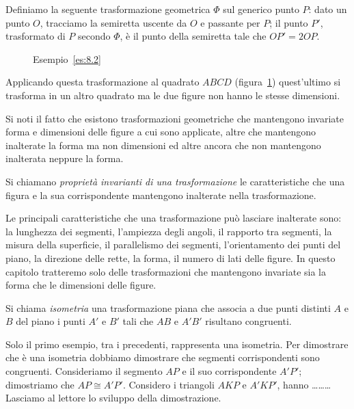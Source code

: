 \begin{esempio}\label{es:8.2}
Definiamo la seguente trasformazione geometrica $\Phi$ sul generico 
punto $P$: dato un punto $O$, tracciamo la semiretta uscente da $O$ e 
passante per $P$; il punto $P'$, trasformato di $P$ secondo $\Phi$, è 
il punto della semiretta tale che $OP'=2OP$.\vspace{7pt}


\begin{inaccessibleblock}
 \begin{figure}[!htb]
    \centering
  \caption{Esempio~\ref{es:8.2}}\label{fig:es8.2}
\end{figure}
\end{inaccessibleblock}

Applicando questa trasformazione al quadrato $ABCD$ 
(figura~\ref{fig:es8.2}) quest'ultimo si trasforma in un altro 
quadrato ma le due figure non hanno le stesse dimensioni.
\end{esempio}

Si noti il fatto che esistono trasformazioni geometriche che 
mantengono invariate forma e dimensioni delle figure a cui sono 
applicate, altre che mantengono inalterate la forma ma non dimensioni 
ed altre ancora che non mantengono inalterata neppure la forma.

\begin{definizione}
Si chiamano \emph{proprietà invarianti di una trasformazione} le 
caratteristiche che una figura e la sua corrispondente mantengono 
inalterate nella trasformazione.
\end{definizione}

Le principali caratteristiche che una trasformazione può lasciare 
inalterate sono: la lunghezza dei segmenti, l'ampiezza degli angoli, 
il rapporto tra segmenti, la misura della superficie, il parallelismo 
dei segmenti, l'orientamento dei punti del piano, la direzione delle 
rette, la forma, il numero di lati delle figure.
In questo capitolo tratteremo solo delle trasformazioni che 
mantengono invariate sia la forma che le dimensioni delle figure.

\begin{definizione}
Si chiama \emph{isometria} una trasformazione piana che associa a due 
punti distinti $A$ e $B$ del piano i punti $A'$ e $B'$ tali che $AB$ 
e $A'B'$ risultano congruenti.
\end{definizione}

Solo il primo esempio, tra i precedenti, rappresenta una isometria. 
Per dimostrare che è una isometria dobbiamo dimostrare che segmenti 
corrispondenti sono congruenti. Consideriamo il segmento $AP$ e il 
suo corrispondente $A'P'$; dimostriamo che $AP\cong A'P'$. Considero 
i triangoli $AKP$ e $A'KP'$, hanno \ldots\ldots\ldots{}
Lasciamo al lettore lo sviluppo della dimostrazione.


